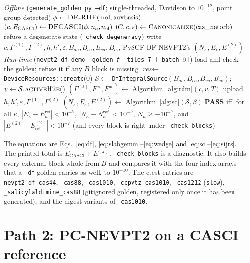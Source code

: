 \documentclass[11pt]{article}
\newcommand{\code}[1]{\texttt{#1}}
\newcommand{\G}[1]{\Gamma^{(#1)}}
\newcommand{\eps}{\varepsilon}
\newcommand{\Fca}{F^{\mathrm{ca}}}
\newcommand{\Fac}{F^{\mathrm{ac}}}
\begin{document}
\begin{algorithm}[htbp]
\caption{Path 1, SC on CASCI orbitals}
\label{alg:path1}
\begin{algorithmic}[1]
\Statex \textit{Offline} (\code{generate\_golden.py --df}; single-threaded, Davidson to $10^{-12}$, point group detected)
\State $\phi \gets \textsc{DF-RHF}(\text{mol}, \text{auxbasis})$
\State $(c, E_{\mathrm{CASCI}}) \gets \textsc{DFCASCI}(\phi, n_a, n_{\mathrm{el}})$ 
\State $(C, c, \eps) \gets \textsc{Canonicalize}(\text{cas\_natorb})$ 
\State refuse a degenerate state (\code{\_check\_degeneracy})
\State write $c, \G1, \G2, h, h', \eps, B_{aa}, B_{ca}, B_{va}, B_{cv}$, PySCF DF-NEVPT2's $(N_\kappa, E_\kappa, E^{(2)})$
\Statex \textit{Run time} (\code{nevpt2\_df\_demo --golden \textit{f} --tiles \textit{T} [--batch $\beta$]})
\State load and check the golden; refuse it if any $B$ block is missing
\State $\textit{res} \gets$ \code{DeviceResources::create}(0) 
\State $\mathcal S \gets$ \code{DfIntegralSource}$(B_{aa},B_{ca},B_{va},B_{cv})$;\ $v \gets \mathcal S.\textsc{activeH2e}()$
\State $(\G3, \Fca, \Fac) \gets$ Algorithm~\ref{alg:rdm}$(c, v, T)$
\State upload $h, h', \eps, \G1, \G2$
\State $(N_\kappa, E_\kappa, E^{(2)}) \gets$ Algorithm~\ref{alg:sc}$(\mathcal S, \beta)$
\State \textbf{PASS} iff, for all $\kappa$, $|E_\kappa - E^{\mathrm{ref}}_\kappa| < 10^{-7}$, $|N_\kappa - N^{\mathrm{ref}}_\kappa| < 10^{-7}$, $N_\kappa \ge -10^{-7}$, and $|E^{(2)} - E^{(2)}_{\mathrm{ref}}| < 10^{-7}$ (and every block is right under \code{--check-blocks})
\end{algorithmic}
\end{algorithm}

The equations are Eqs.~\eqref{eq:df}, \eqref{eq:slabgemm}--\eqref{eq:wedge}
and \eqref{eq:sc}--\eqref{eq:sijrs}. The printed total is $E_{\mathrm{CASCI}}
+ E^{(2)}$. \code{--check-blocks} is a diagnostic. It also builds every
external block whole from $B$ and compares it with the four-index arrays that
a \code{--df} golden carries as well, to $10^{-10}$. The ctest entries are
\code{nevpt2\_df\_cas44}, \code{\_cas88}, \code{\_cas1010},
\code{\_ccpvtz\_cas1010}, \code{\_cas1212} (\code{slow}),
\code{\_salicylaldimine\_cas88} (gitignored golden, registered only once it
has been generated), and the digest variants of \code{\_cas1010}.

\section{Path 2: PC-NEVPT2 on a CASCI reference}
\label{sec:pc-casci}
\end{document}

